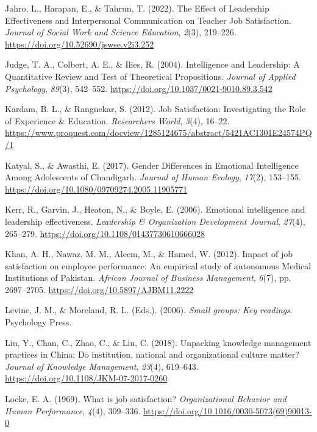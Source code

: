 \documentclass[
  man,
  longtable,
  nolmodern,
  notxfonts,
  notimes,
  colorlinks=true,linkcolor=blue,citecolor=blue,urlcolor=blue]{apa7}
\newlength{\cslhangindent}
\newenvironment{CSLReferences}[2] %
 {\begin{list}{}{%
  \setlength{\itemindent}{0pt}
  \setlength{\leftmargin}{0pt}
  \setlength{\parsep}{0pt}
  \ifodd #1
   \setlength{\leftmargin}{\cslhangindent}
   \setlength{\itemindent}{-1\cslhangindent}
  \fi
  \setlength{\itemsep}{#2\baselineskip}}}
 {\end{list}}
\begin{document}
\begin{CSLReferences}{1}{0}
Jahro, L., Harapan, E., \& Tahrun, T. (2022). The {Effect} of
{Leadership Effectiveness} and {Interpersonal Communication} on {Teacher
Job Satisfaction}. \emph{Journal of Social Work and Science Education},
\emph{2}(3), 219--226. \url{https://doi.org/10.52690/jswse.v2i3.252}

Judge, T. A., Colbert, A. E., \& Ilies, R. (2004). Intelligence and
{Leadership}: {A Quantitative Review} and {Test} of {Theoretical
Propositions}. \emph{Journal of Applied Psychology}, \emph{89}(3),
542--552. \url{https://doi.org/10.1037/0021-9010.89.3.542}

Kardam, B. L., \& Rangnekar, S. (2012). Job {Satisfaction}:
{Investigating} the {Role} of {Experience} \& {Education}.
\emph{Researchers World}, \emph{3}(4), 16--22.
\url{https://www.proquest.com/docview/1285124675/abstract/5421AC1301E24574PQ/1}

Katyal, S., \& Awasthi, E. (2017). Gender {Differences} in {Emotional
Intelligence Among Adolescents} of {Chandigarh}. \emph{Journal of Human
Ecology}, \emph{17}(2), 153--155.
\url{https://doi.org/10.1080/09709274.2005.11905771}

Kerr, R., Garvin, J., Heaton, N., \& Boyle, E. (2006). Emotional
intelligence and leadership effectiveness. \emph{Leadership \&
Organization Development Journal}, \emph{27}(4), 265--279.
\url{https://doi.org/10.1108/01437730610666028}

Khan, A. H., Nawaz, M. M., Aleem, M., \& Hamed, W. (2012). Impact of job
satisfaction on employee performance: {An} empirical study of autonomous
{Medical Institutions} of {Pakistan}. \emph{African Journal of Business
Management}, \emph{6}(7), pp. 2697--2705.
\url{https://doi.org/10.5897/AJBM11.2222}

Levine, J. M., \& Moreland, R. L. (Eds.). (2006). \emph{Small groups:
Key readings}. Psychology Press.

Liu, Y., Chan, C., Zhao, C., \& Liu, C. (2018). Unpacking knowledge
management practices in {China}: Do institution, national and
organizational culture matter? \emph{Journal of Knowledge Management},
\emph{23}(4), 619--643. \url{https://doi.org/10.1108/JKM-07-2017-0260}

Locke, E. A. (1969). What is job satisfaction? \emph{Organizational
Behavior and Human Performance}, \emph{4}(4), 309--336.
\url{https://doi.org/10.1016/0030-5073(69)90013-0}


\end{CSLReferences}
\end{document}

